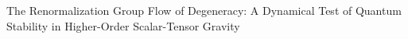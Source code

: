 \documentclass[twocolumn]{aastex631}
\begin{document}
The Renormalization Group Flow of Degeneracy: A Dynamical Test of Quantum Stability in Higher-Order Scalar-Tensor Gravity
\end{document}
